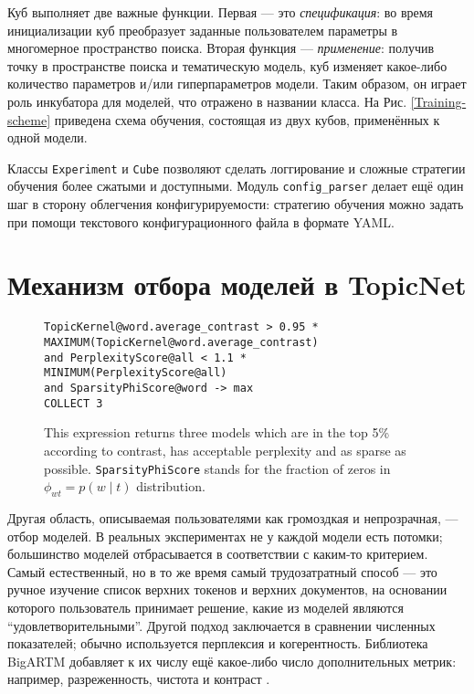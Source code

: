 Куб выполняет две важные функции. Первая --- это \textit{спецификация}: во время инициализации куб преобразует заданные пользователем параметры в многомерное пространство поиска. Вторая функция --- \textit{применение}: получив точку в пространстве поиска и тематическую модель, куб изменяет какое-либо количество параметров и/или гиперпараметров модели. Таким образом, он играет роль инкубатора для моделей, что отражено в названии класса. На Рис.  \ref{Training-scheme} приведена схема обучения, состоящая из двух кубов, применённых к одной модели.  

Классы \texttt{Experiment} и \texttt{Cube} позволяют сделать логгирование и сложные стратегии обучения более сжатыми и доступными. Модуль \texttt{config\_parser} делает ещё один шаг в сторону облегчения конфигурируемости: стратегию обучения можно задать при помощи текстового конфигурационного файла в формате YAML.  

\section{Механизм отбора моделей в TopicNet} 

\begin{figure*}[!ht]
\footnotesize
\texttt{TopicKernel@word.average\_contrast > 0.95 * MAXIMUM(TopicKernel@word.average\_contrast) \\
\hphantom{\ \ } and PerplexityScore@all < 1.1 * MINIMUM(PerplexityScore@all) \\
\hphantom{\ \ } and SparsityPhiScore@word -> max\\
\hphantom{\ \ } COLLECT 3}
\caption{This expression returns three models which are in the top 5\% according to contrast, has acceptable perplexity and as sparse as possible. \texttt{SparsityPhiScore} stands for the fraction of zeros in $\phi_{wt} = p(w \mid t)$ distribution.}
\label{DSL-example}
\end{figure*} 

Другая область, описываемая пользователями как громоздкая и непрозрачная, --- отбор моделей. В реальных экспериментах не у каждой модели есть потомки; большинство моделей отбрасывается в соответствии с каким-то критерием. Самый естественный, но в то же время самый трудозатратный способ --- это ручное изучение список верхних токенов и верхних документов, на основании которого пользователь принимает решение, какие из моделей являются ``удовлетворительными''. Другой подход заключается в сравнении численных показателей; обычно используется перплексия и когерентность. Библиотека \mbox{BigARTM} добавляет к их числу ещё какое-либо число дополнительных метрик: например, разреженность, чистота и контраст \cite{voron15mlj}.  


